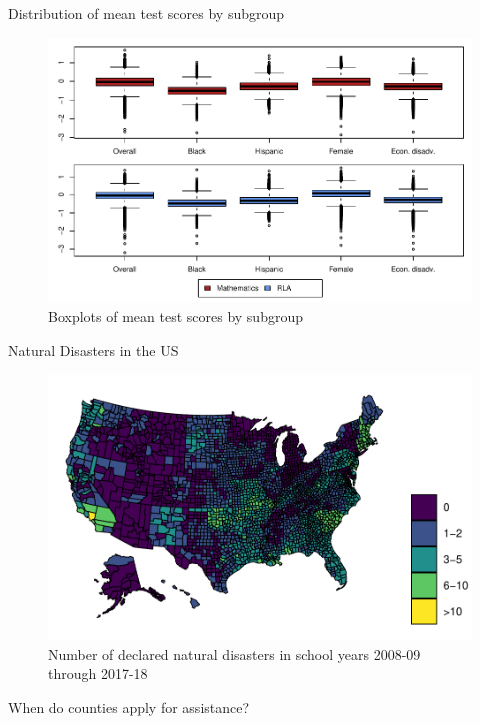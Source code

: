 \documentclass[hyperref={colorlinks = true,linkcolor = blue, citecolor=blue,urlcolor=blue}]{beamer}
\begin{document}
\begin{frame}{Distribution of mean test scores by subgroup}
	\begin{figure}[!h]
		\centering
		\includegraphics[scale=0.68]{"../Code & Data/DepVarsBoxplot.pdf"}
		\caption{Boxplots of mean test scores by subgroup}
		\label{DepVarsBoxplot}
	\end{figure}
\end{frame}


\begin{frame}{Natural Disasters in the US}
	\begin{figure}[!h]
		\centering
		\includegraphics[scale=0.65]{"../Code & Data/DisasterMap.pdf"}
		\caption{Number of declared natural disasters in school years 2008-09 through 2017-18}
		\label{DisasterMap}
	\end{figure}
\end{frame}

\begin{frame}{When do counties apply for assistance?}
	\small
	
\end{frame}
\end{document}
